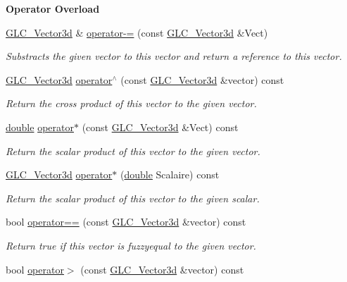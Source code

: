\begin{Indent}{\bf Operator Overload}
\begin{DoxyCompactItemize}
\hyperlink{class_g_l_c___vector3d}{G\-L\-C\-\_\-\-Vector3d} \& \hyperlink{class_g_l_c___vector3d_acd52074a8b5e5a5a3255016caab94f03}{operator-\/=} (const \hyperlink{class_g_l_c___vector3d}{G\-L\-C\-\_\-\-Vector3d} \&Vect)
\begin{DoxyCompactList}\small\item\em Substracts the given vector to this vector and return a reference to this vector. \end{DoxyCompactList}\item 
\hyperlink{class_g_l_c___vector3d}{G\-L\-C\-\_\-\-Vector3d} \hyperlink{class_g_l_c___vector3d_af2a69c12cd9e9e442a940c73476760d3}{operator$^\wedge$} (const \hyperlink{class_g_l_c___vector3d}{G\-L\-C\-\_\-\-Vector3d} \&vector) const 
\begin{DoxyCompactList}\small\item\em Return the cross product of this vector to the given vector. \end{DoxyCompactList}\item 
\hyperlink{_super_l_u_support_8h_a8956b2b9f49bf918deed98379d159ca7}{double} \hyperlink{class_g_l_c___vector3d_aab2bafa90c18b8965862431112c3fa68}{operator$\ast$} (const \hyperlink{class_g_l_c___vector3d}{G\-L\-C\-\_\-\-Vector3d} \&Vect) const 
\begin{DoxyCompactList}\small\item\em Return the scalar product of this vector to the given vector. \end{DoxyCompactList}\item 
\hyperlink{class_g_l_c___vector3d}{G\-L\-C\-\_\-\-Vector3d} \hyperlink{class_g_l_c___vector3d_ab693b4ba2082647ab053c68533a9ec52}{operator$\ast$} (\hyperlink{_super_l_u_support_8h_a8956b2b9f49bf918deed98379d159ca7}{double} Scalaire) const 
\begin{DoxyCompactList}\small\item\em Return the scalar product of this vector to the given scalar. \end{DoxyCompactList}\item 
bool \hyperlink{class_g_l_c___vector3d_aca0d507e9229ced1fe7dff8e6b2163b9}{operator==} (const \hyperlink{class_g_l_c___vector3d}{G\-L\-C\-\_\-\-Vector3d} \&vector) const 
\begin{DoxyCompactList}\small\item\em Return true if this vector is fuzzyequal to the given vector. \end{DoxyCompactList}\item 
bool \hyperlink{class_g_l_c___vector3d_a5f9b393f490470c68ad4a6c96d953489}{operator$>$} (const \hyperlink{class_g_l_c___vector3d}{G\-L\-C\-\_\-\-Vector3d} \&vector) const 

\end{DoxyCompactItemize}
\end{Indent}
